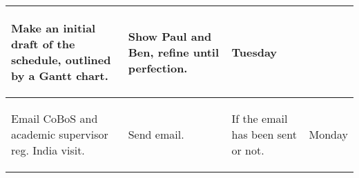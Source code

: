 \begin{table}[!h]
\begin{tabularx}{\textwidth}{|X|X|X|l|}
        \begin{myitemize}
            \item Make an initial draft of the schedule, outlined by a Gantt chart.
        \end{myitemize} &
        \begin{myitemize}
            \item Show Paul and Ben, refine until perfection.
        \end{myitemize} &
        Tuesday \\
        \hline
        Email CoBoS and academic supervisor reg. India visit. &
        \begin{myitemize}
            \item Send email.
        \end{myitemize} &
        \begin{myitemize}
            \item If the email has been sent or not.
        \end{myitemize} &
        Monday \\
        \hline
    \end{tabularx}
\end{table}
